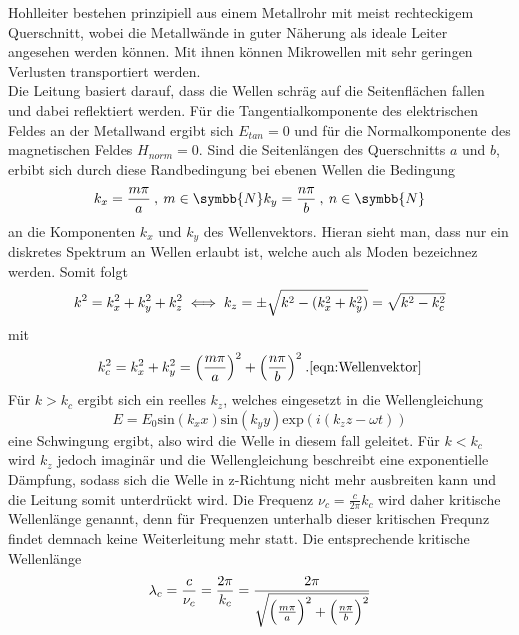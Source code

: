 Hohlleiter bestehen prinzipiell aus einem Metallrohr mit meist rechteckigem Querschnitt, wobei die
Metallwände in guter Näherung als ideale Leiter angesehen werden können. Mit ihnen können
Mikrowellen mit sehr geringen Verlusten transportiert werden. \\
Die Leitung basiert darauf, dass die Wellen schräg auf die Seitenflächen fallen und dabei reflektiert werden.
Für die Tangentialkomponente des elektrischen Feldes an der Metallwand ergibt sich $E_{tan}=0 $ und für die
Normalkomponente des magnetischen Feldes $H_{norm}=0$. Sind die Seitenlängen des Querschnitts $a$ und $b$,
erbibt sich durch diese Randbedingung bei ebenen Wellen die Bedingung
\begin{equation}
  k_x = \frac{m\pi}{a} \:, \: m \in \symbb{N} \\
  k_y = \frac{n\pi}{b} \:, \: n \in \symbb{N}
  \label{eqn:Bwv}
\end{equation}
an die Komponenten $k_x$ und $k_y$ des Wellenvektors.
Hieran sieht man, dass nur ein diskretes Spektrum an Wellen erlaubt ist, welche auch als Moden bezeichnez werden.
Somit folgt
\begin{equation}
  k^2 = k_x^2 + k_y^2 + k_z^2 \\
  \iff k_z = \pm \sqrt{k^2-(k_x^2 + k_y^2)} = \sqrt{k^2-k_c^2}
  \label{eqn:wellenv}
\end{equation}
mit
\begin{equation}
  k_c^2=k_x^2 + k_y^2= \Bigl(\frac{m\pi}{a}\Bigr)^2 + \Bigl(\frac{n\pi}{b}\Bigr)^2 \:.
  \ref{eqn:Wellenvektor}
\end{equation}
Für $k>k_c$ ergibt sich ein reelles $k_z$, welches eingesetzt in die Wellengleichung
\begin{equation}
  E=E_0 \text{sin}(k_xx)\text{sin}(k_yy)\text{exp}(i(k_zz-\omega t))
  \label{eqn:Wellengleichung}
\end{equation}
eine Schwingung ergibt, also wird die Welle in diesem fall geleitet. Für $k<k_c$ wird
$k_z$ jedoch imaginär und die Wellengleichung beschreibt eine exponentielle Dämpfung,
sodass sich die Welle in z-Richtung nicht mehr ausbreiten kann und die Leitung somit unterdrückt wird.
Die Frequenz $\nu_c = \frac{c}{2\pi}k_c$ wird daher kritische Wellenlänge genannt, denn
für Frequenzen unterhalb dieser kritischen Frequnz findet demnach keine
Weiterleitung mehr statt. Die entsprechende kritische Wellenlänge
\begin{equation}
  \lambda_c = \frac{c}{\nu_c}=\frac{2\pi}{k_c} =\frac{2\pi}{\sqrt{\Bigl(\frac{m\pi}{a}\Bigr)^2 + \Bigl(\frac{n\pi}{b}\Bigr)^2}}
  \label{eqn:Lambdac}
\end{equation}

